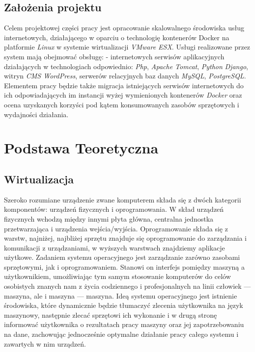 \documentclass[polish, a4paper, 12pt, oneside]{book}
\begin{document}
	\section{Założenia projektu}
	Celem projektowej części pracy jest opracowanie skalowalnego środowiska usług internetowych, działającego w oparciu o technologię kontenerów Docker na platformie \textit{Linux} w systemie wirtualizacji \textit{VMware ESX}\cite{vmwareesx}. Usługi realizowane przez system mają obejmować obsługę: - internetowych serwisów aplikacyjnych działających w technologiach odpowiednio: \textit{Php}\cite{php}, \textit{Apache Tomcat}\cite{apachetomcat}, \textit{Python}\cite{python} \textit{Django}\cite{django}, witryn \textit{CMS WordPress}\cite{wordpress}, serwerów relacyjnych baz danych \textit{MySQL}\cite{mysql}, \textit{PostgreSQL}\cite{postgresql}. Elementem pracy będzie także migracja istniejących serwisów internetowych do ich odpowiadających im instancji wyżej wymienionych kontenerów \textit{Docker}\cite{docker} oraz ocena uzyskanych korzyści pod kątem konsumowanych zasobów sprzętowych i wydajności działania. 
	
	\chapter{Podstawa Teoretyczna}
	\section{Wirtualizacja}
	Szeroko rozumiane urządzenie zwane komputerem składa się z dwóch kategorii komponentów: urządzeń fizycznych i oprogramowania. W skład urządzeń fizycznych wchodzą między innymi płyta główna, centralna jednostka przetwarzająca i urządzenia wejścia/wyjścia. Oprogramowanie składa się z warstw, najniżej, najbliżej sprzętu znajduje się oprogramowanie do zarządzania i komunikacji z urządzaniami, w wyższych warstwach znajdziemy aplikacje użytkowe. Zadaniem systemu operacyjnego jest zarządzanie zarówno zasobami sprzętowymi, jak i oprogramowaniem. Stanowi on interfejs pomiędzy maszyną a użytkownikiem, umożliwiając tym samym stosowanie komputerów do celów osobistych znanych nam z życia codziennego i profesjonalnych na linii człowiek — maszyna, ale i maszyna — maszyna. Ideą systemu operacyjnego jest istnienie środowiska, które dynamicznie będzie tłumaczyć zlecenia użytkownika na język maszynowy, następnie zlecać sprzętowi ich wykonanie i w drugą stronę informować użytkownika o rezultatach pracy maszyny oraz jej zapotrzebowaniu na dane, zachowując jednocześnie optymalne działanie pracy całego systemu i zawartych w nim urządzeń.
	
\end{document}
